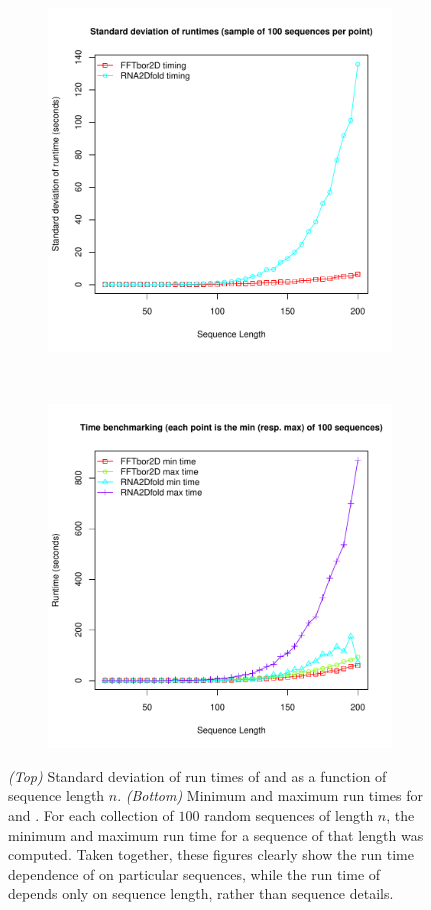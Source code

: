 \begin{figure}[!ht]
\centering
\begin{subfigure}[h]{\textwidth}
\centering
\includegraphics[width=.65\textwidth]{Figures/FFTbor2D/ffttwoRtwofoldStdev.pdf}
\end{subfigure} \\
\begin{subfigure}[h]{\textwidth}
\centering
\includegraphics[width=.65\textwidth]{Figures/FFTbor2D/ffttwoRtwofoldMinMax.pdf}
\end{subfigure}
\caption[{\em (Top)}
Standard deviation of run times of \rnatwofold and \ffttwo
as a function of sequence length $n$.
{\em (Bottom)}
Minimum and maximum run times for \rnatwofold and \ffttwo]{
{\em (Top)}
Standard deviation of run times of \rnatwofold and \ffttwo
as a function of sequence length $n$.
{\em (Bottom)}
Minimum and maximum run times for \rnatwofold and \ffttwo.
For each collection of $100$ random sequences of length $n$, the minimum
and maximum run time for a sequence of that length was computed.
Taken together, these figures clearly show the
run time dependence of \rnatwofold on particular sequences, while
the run time of \ffttwo depends only on sequence length, rather than
sequence details.
}
\label{fig:ffttwo:ffttwoRtwofoldStdevMinMax}
\end{figure}

